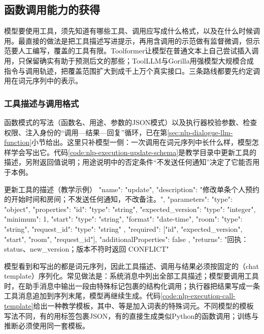 \subsection{函数调用能力的获得}
\label{sec:nlp-execution-function-calling}

模型要使用工具，须先知道有哪些工具、调用应写成什么格式，以及在什么时候调用。最直接的做法是把工具描述写进提示，再用含调用的示范做有监督微调，但示范要人工编写，覆盖的工具有限。Toolformer让模型在普通文本上自己尝试插入调用，只保留确实有助于预测后文的那些；ToolLLM与Gorilla用强模型大规模合成指令与调用轨迹，把覆盖范围扩大到成千上万个真实接口。三条路线都要先约定调用在词元序列中的表示。

\subsubsection{工具描述与调用格式}
\label{sec:nlp-execution-call-format}

函数模式的写法（函数名、用途、参数的JSON模式）以及执行器校验参数、检查权限、注入身份的“调用—结果—回复”循环，已在第\ref{sec:nlp-dialogue-llm-function}小节给出。这里只补模型一侧：一次调用在词元序列中长什么样，模型怎样学会写出它。代码\ref{code:nlp-execution-update-schema}是教学目录中更新工具的描述，另附返回值说明；用途说明中的否定条件“不发送任何通知”决定了它能否用于本例。

\begin{codeblock}[label={code:nlp-execution-update-schema}]{更新工具的描述（教学示例）}
{
  "name": "update",
  "description": "修改单条个人预约的开始时间和房间；不发送任何通知，不改备注。",
  "parameters": {
    "type": "object",
    "properties": {
      "id":               {"type": "string"},
      "expected_version": {"type": "integer", "minimum": 1},
      "start":            {"type": "string", "format": "date-time"},
      "room":             {"type": "string"},
      "request_id":       {"type": "string"}
    },
    "required": ["id", "expected_version", "start", "room", "request_id"],
    "additionalProperties": false
  },
  "returns": "回执：status、new_version；版本不符时返回 CONFLICT"
}
\end{codeblock}

模型看到和写出的都是词元序列，因此工具描述、调用与结果必须按固定的（chat template）序列化。常见做法是：系统消息中列出全部工具描述；模型要调用工具时，在助手消息中输出一段由特殊标记包裹的结构化调用；执行器把结果写成一条工具消息追加到序列末尾，模型再继续生成。代码\ref{code:nlp-execution-call-template}给出一种教学模板，其中、等是加入词表的特殊词元。不同模型的模板写法不同，有的用标签包裹JSON，有的直接生成类似Python的函数调用；训练与推断必须使用同一套模板。

